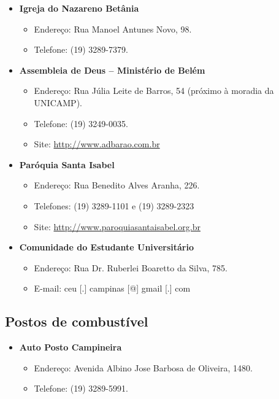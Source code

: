 \begin{itemize}
\item  \textbf{Igreja do Nazareno Betânia}
\begin{itemize}
\item  Endereço: Rua Manoel Antunes Novo, 98.
\item  Telefone: (19) 3289-7379.
\end{itemize}
\end{itemize}

\begin{itemize}
\item  \textbf{Assembleia de Deus -- Ministério de Belém}
\begin{itemize}
\item  Endereço: Rua Júlia Leite de Barros, 54 (próximo à moradia da UNICAMP).
\item  Telefone: (19) 3249-0035.
\item  Site: \url{http://www.adbarao.com.br}
\end{itemize}
\end{itemize}

\begin{itemize}
\item  \textbf{Paróquia Santa Isabel}
\begin{itemize}
\item  Endereço: Rua Benedito Alves Aranha, 226.
\item  Telefones: (19) 3289-1101 e (19) 3289-2323
\item  Site: \url{http://www.paroquiasantaisabel.org.br}
\end{itemize}
\end{itemize}

\begin{itemize}
\item  \textbf{Comunidade do Estudante Universitário}
\begin{itemize}
\item  Endereço: Rua Dr. Ruberlei Boaretto da Silva, 785.
\item  E-mail: ceu [.] campinas [@] gmail [.] com
\end{itemize}
\end{itemize}

\subsection{Postos de combustível}

\begin{itemize}
\item  \textbf{Auto Posto Campineira}
\begin{itemize}
\item  Endereço: Avenida Albino Jose Barbosa de Oliveira, 1480.
\item  Telefone: (19) 3289-5991.
\end{itemize}
\end{itemize}

